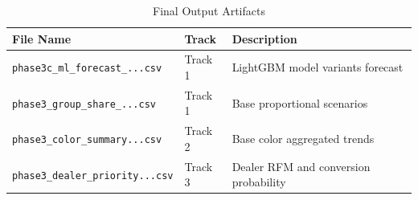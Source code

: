 \begin{table}[hbt!]
\centering
\caption{Final Output Artifacts}
\label{tab:final_artifacts}
\begin{tabular}{@{} l l p{6cm} @{}}
\toprule
\textbf{File Name} & \textbf{Track} & \textbf{Description} \\
\midrule
\texttt{phase3c\_ml\_forecast\_...csv} & Track 1 & LightGBM model variants forecast \\
\texttt{phase3\_group\_share\_...csv} & Track 1 & Base proportional scenarios \\
\texttt{phase3\_color\_summary...csv} & Track 2 & Base color aggregated trends \\
\texttt{phase3\_dealer\_priority...csv} & Track 3 & Dealer RFM and conversion probability \\
\bottomrule
\end{tabular}
\end{table}
